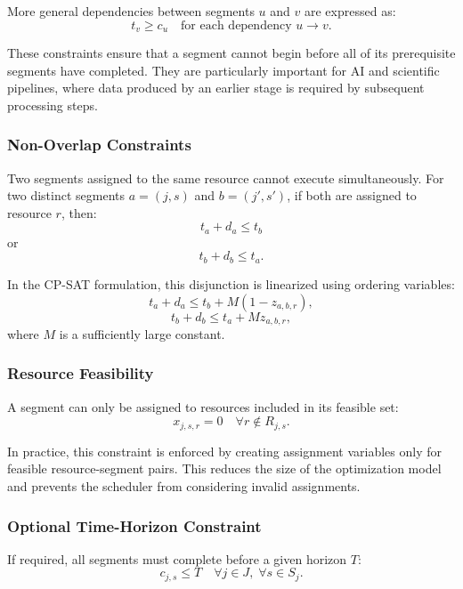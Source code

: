 \documentclass[conference]{IEEEtran}
\begin{document}
More general dependencies between segments \(u\) and \(v\) are expressed as:
\begin{equation}
t_v \geq c_u
\quad
\text{for each dependency } u \rightarrow v.
\end{equation}

These constraints ensure that a segment cannot begin before all of its
prerequisite segments have completed. They are particularly important for AI
and scientific pipelines, where data produced by an earlier stage is required
by subsequent processing steps.

\subsubsection{Non-Overlap Constraints}
Two segments assigned to the same resource cannot execute simultaneously. For
two distinct segments \(a=(j,s)\) and \(b=(j',s')\), if both are assigned to
resource \(r\), then:
\begin{equation}
t_a + d_a \leq t_b
\end{equation}
or
\begin{equation}
t_b + d_b \leq t_a.
\end{equation}

In the CP-SAT formulation, this disjunction is linearized using ordering
variables:
\begin{equation}
t_a + d_a \leq t_b + M(1-z_{a,b,r}),
\end{equation}
\begin{equation}
t_b + d_b \leq t_a + M z_{a,b,r},
\end{equation}
where \(M\) is a sufficiently large constant.

\subsubsection{Resource Feasibility}
A segment can only be assigned to resources included in its feasible set:
\begin{equation}
x_{j,s,r} = 0
\quad
\forall r \notin R_{j,s}.
\end{equation}

In practice, this constraint is enforced by creating assignment variables only
for feasible resource-segment pairs. This reduces the size of the optimization
model and prevents the scheduler from considering invalid assignments.

\subsubsection{Optional Time-Horizon Constraint}
If required, all segments must complete before a given horizon \(T\):
\begin{equation}
c_{j,s} \leq T
\quad
\forall j \in J,\; \forall s \in S_j.
\end{equation}
\end{document}
